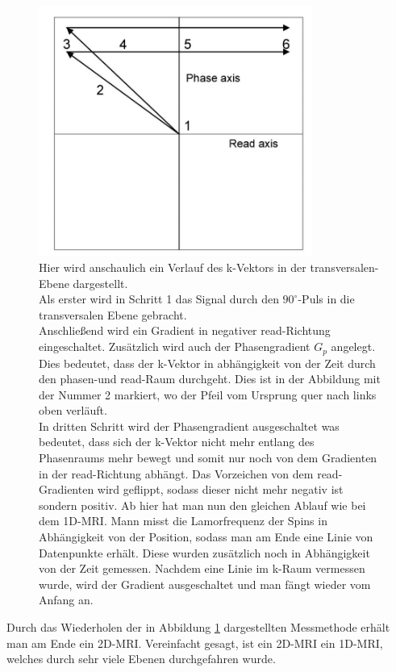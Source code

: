 \begin{figure}[H]
    \centering
    \includegraphics[width = 0.8\textwidth]{Abbildungen/2DMRI.JPG}
    \caption{Hier wird anschaulich ein Verlauf des k-Vektors in der transversalen-Ebene dargestellt.\\
    Als erster wird in Schritt 1 das Signal durch den $90^{\circ}$-Puls in die transversalen Ebene gebracht.\\
    Anschließend wird ein Gradient in negativer read-Richtung eingeschaltet. Zusätzlich wird auch der Phasengradient $G_p$ angelegt. Dies bedeutet, dass der k-Vektor in abhängigkeit von der Zeit durch den phasen-und read-Raum durchgeht. Dies ist in der Abbildung mit der Nummer 2 markiert, wo der Pfeil vom Ursprung quer nach links oben verläuft.\\
    In dritten Schritt wird der Phasengradient ausgeschaltet was bedeutet, dass sich der k-Vektor nicht mehr entlang des Phasenraums mehr bewegt und somit nur noch von dem Gradienten in der read-Richtung abhängt. Das Vorzeichen von dem read-Gradienten wird geflippt, sodass dieser nicht mehr negativ ist sondern positiv. Ab hier hat man nun den gleichen Ablauf wie bei dem 1D-MRI. Mann misst die Lamorfrequenz der Spins in Abhängigkeit von der Position, sodass man am Ende eine Linie von Datenpunkte erhält. Diese wurden  zusätzlich noch in Abhängigkeit von der Zeit gemessen. Nachdem eine Linie im k-Raum vermessen wurde, wird der Gradient ausgeschaltet und man fängt wieder vom Anfang an.\\ \cite{Schmidt}}
    \label{fig:2DMRIk}
\end{figure}
Durch das Wiederholen der in Abbildung \ref{fig:2DMRIk} dargestellten Messmethode erhält man am Ende ein 2D-MRI. Vereinfacht gesagt, ist ein 2D-MRI ein 1D-MRI, welches durch sehr viele Ebenen durchgefahren wurde.

